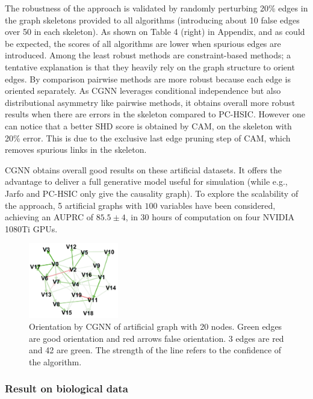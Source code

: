 \documentclass[a4paper, 11pt]{article}
\begin{document}
The robustness of the approach is validated by randomly perturbing 20\% edges in the graph skeletons provided to all algorithms (introducing about 10 false edges over 50 in each skeleton). As shown on Table 4 (right) in Appendix, and as could be expected, the scores of all algorithms are lower when spurious edges are introduced. Among the least robust methods are constraint-based methods; a tentative explanation is that they heavily rely on the graph structure to orient edges. By comparison pairwise methods are more robust because each edge is oriented separately. As CGNN leverages conditional independence but also distributional asymmetry like pairwise methods, it obtains overall more robust results when there are errors in the skeleton compared to PC-HSIC. However one can notice that a better SHD score is obtained by CAM, on the skeleton with 20\% error. This is due to the exclusive last edge pruning step of CAM, which removes spurious links in the skeleton.

CGNN obtains overall good results on these artificial datasets. It offers the advantage to  deliver a full generative model useful for simulation (while e.g., Jarfo and PC-HSIC only give the causality graph). 
 To explore the scalability of the approach, 5 artificial graphs with $100$ variables have been considered, achieving an AUPRC of $85.5 \pm 4$, in 30 hours of computation on four NVIDIA 1080Ti GPUs.  

\begin{figure}[h!]
\centering
\includegraphics[width=0.35\textwidth]{graph_multadd_cgnn.png}
\caption{Orientation by CGNN of artificial graph with 20 nodes. Green edges are good orientation and red arrows false orientation. 3 edges are red and 42 are green. The strength of the line refers to the confidence of the algorithm.}
\label{fig:graph_multadd_cgnn}
\end{figure}


\subsubsection{Result on biological data}
\end{document}
